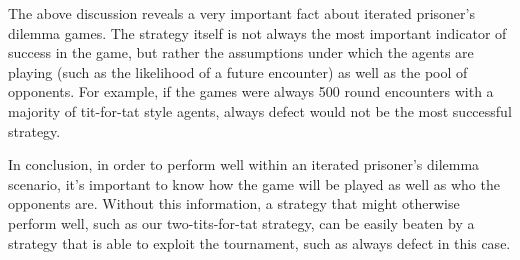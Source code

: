 \documentclass[a4paper]{article}
\begin{document}
The above discussion reveals a very important fact about iterated prisoner's dilemma games. The strategy itself is not always the most important indicator of success in the game, but rather the assumptions under which the agents are playing (such as the likelihood of a future encounter) as well as the pool of opponents. For example, if the games were always 500 round encounters with a majority of tit-for-tat style agents, always defect would not be the most successful strategy.

In conclusion, in order to perform well within an iterated prisoner's dilemma scenario, it's important to know how the game will be played as well as who the opponents are. Without this information, a strategy that might otherwise perform well, such as our two-tits-for-tat strategy, can be easily beaten by a strategy that is able to exploit the tournament, such as always defect in this case.



\end{document}

